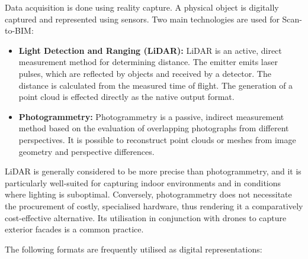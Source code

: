 \begin{English}
    Data acquisition is done using reality capture. A physical object is digitally captured and represented using sensors. Two main technologies are used for Scan-to-BIM:

    \begin{itemize}
        \item \textbf{Light Detection and Ranging (LiDAR):} LiDAR is an active, direct measurement method for determining distance. The emitter emits laser pulses, which are reflected by objects and received by a detector. The distance is calculated from the measured time of flight. The generation of a point cloud is effected directly as the native output format. \cite{rashdiScanningTechnologiesBuilding2022}
        \item \textbf{Photogrammetry:} Photogrammetry is a passive, indirect measurement method based on the evaluation of overlapping photographs from different perspectives. It is possible to reconstruct point clouds or meshes from image geometry and perspective differences. \cite{rashdiScanningTechnologiesBuilding2022}
    \end{itemize}

    LiDAR is generally considered to be more precise than photogrammetry, and it is particularly well-suited for capturing indoor environments and in conditions where lighting is suboptimal. Conversely, photogrammetry does not necessitate the procurement of costly, specialised hardware, thus rendering it a comparatively cost-effective alternative. Its utilisation in conjunction with drones to capture exterior facades is a common practice. \cite{rashdiScanningTechnologiesBuilding2022}

    The following formats are frequently utilised as digital representations:


\end{English}
